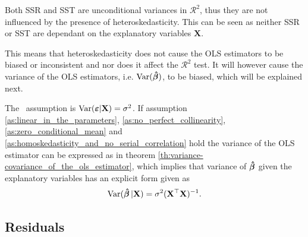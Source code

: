 Both SSR and SST are unconditional variances in $\mathcal{R}^2$, thus they are not influenced by the presence of heteroskedasticity. This can be seen as neither SSR or SST are dependant on the explanatory variables $\textbf{X}$. 

This means that heteroskedasticity does not cause the OLS estimators to be biased or inconsistent and nor does it affect the $\mathcal{R}^2$ test. 
It will however cause the variance of the OLS estimators, i.e. $\operatorname{\text{Var}}(\operatorname{\boldsymbol{\hat{\beta}}})$, to be biased, which will be explained next.  

The \homo \ assumption is $\operatorname{\text{Var}}(\boldsymbol{\varepsilon} | \mathbf{X}) = \sigma^2$. If assumption \ref{as:linear_in_the_parameters}, \ref{as:no_perfect_collinearity}, \ref{as:zero_conditional_mean} and \ref{as:homoskedasticity_and_no_serial_correlation} hold the variance of the OLS estimator can be expressed as in theorem \ref{th:variance-covariance_of_the_ols_estimator}, which implies that variance of $\operatorname{\boldsymbol{\hat{\beta}}}$ given the explanatory variables has an explicit form given as
\begin{align*}
    \operatorname{\text{Var}}(\operatorname{\boldsymbol{\hat{\beta}}} | \mathbf{X}) = \sigma^2(\mathbf{X}^\top\mathbf{X})^{-1}.
\end{align*}

\subsection{Residuals}\label{subsec:residuals}

